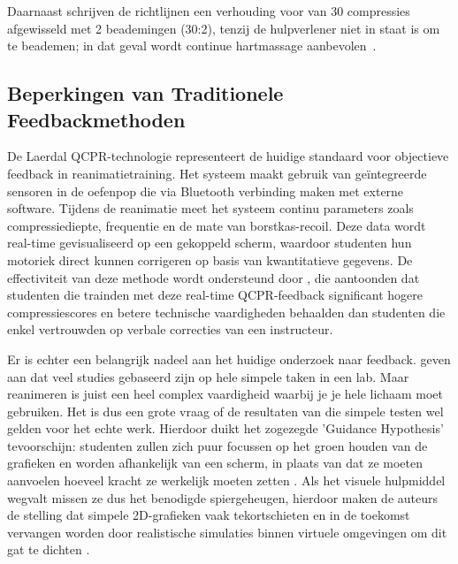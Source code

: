 Daarnaast schrijven de richtlijnen een verhouding voor van 30 compressies afgewisseld met 2 beademingen (30:2), 
tenzij de hulpverlener niet in staat is om te beademen; in dat geval wordt continue hartmassage aanbevolen~\autocite{Olasveengen2021}.


\subsection{Beperkingen van Traditionele Feedbackmethoden}
De Laerdal QCPR-technologie representeert de huidige standaard voor objectieve feedback in reanimatietraining. 
Het systeem maakt gebruik van geïntegreerde sensoren in de oefenpop die via Bluetooth verbinding maken met externe software. 
Tijdens de reanimatie meet het systeem continu parameters zoals compressiediepte, frequentie en de mate van borstkas-recoil. 
Deze data wordt real-time gevisualiseerd op een gekoppeld scherm, waardoor studenten hun motoriek direct kunnen corrigeren op basis van kwantitatieve gegevens.
De effectiviteit van deze methode wordt ondersteund door \textcite{Cortegiani2017}, die aantoonden dat studenten die trainden met deze real-time QCPR-feedback 
significant hogere compressiescores en betere technische vaardigheden behaalden dan studenten die enkel vertrouwden op verbale correcties van een instructeur.

Er is echter een belangrijk nadeel aan het huidige onderzoek naar feedback.\textcite{Sigrist2013} geven aan dat veel studies gebaseerd zijn op hele simpele taken in een lab.
Maar reanimeren is juist een heel complex vaardigheid waarbij je je hele lichaam moet gebruiken. 
Het is dus een grote vraag of de resultaten van die simpele testen wel gelden voor het echte werk. Hierdoor duikt het zogezegde 
'Guidance Hypothesis' tevoorschijn: studenten zullen zich puur focussen op het groen houden van de grafieken en worden afhankelijk van een scherm, 
in plaats van dat ze moeten aanvoelen hoeveel kracht ze werkelijk moeten zetten \autocite{Sigrist2013}. Als het visuele hulpmiddel wegvalt missen ze dus 
het benodigde spiergeheugen, hierdoor maken de auteurs de stelling dat simpele 2D-grafieken vaak tekortschieten en in de toekomst vervangen worden door 
realistische simulaties binnen virtuele omgevingen om dit gat te dichten \autocite{Sigrist2013}.



